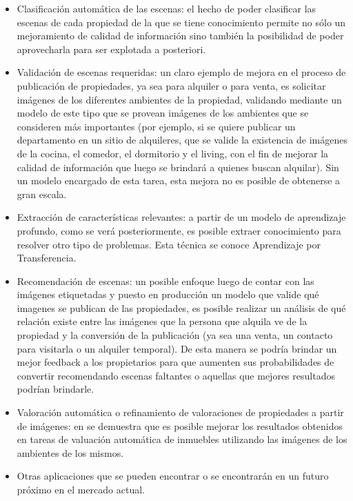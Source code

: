 \begin{itemize}
	\item Clasificación automática de las escenas: el hecho de poder clasificar las escenas de cada propiedad de la que se tiene conocimiento permite no sólo un mejoramiento de calidad de información sino también la posibilidad de poder aprovecharla para ser explotada a posteriori.
	\item Validación de escenas requeridas: un claro ejemplo de mejora en el proceso de publicación de propiedades, ya sea para alquiler o para venta, es solicitar imágenes de los diferentes ambientes de la propiedad, validando mediante un modelo de este tipo que se provean imágenes de los ambientes que se consideren más importantes (por ejemplo, si se quiere publicar un departamento en un sitio de alquileres, que se valide la existencia de imágenes de la cocina, el comedor, el dormitorio y el living, con el fin de mejorar la calidad de información que luego se brindará a quienes buscan alquilar). Sin un modelo encargado de esta tarea, esta mejora no es posible de obtenerse a gran escala.
	\item Extracción de características relevantes: a partir de un modelo de aprendizaje profundo, como se verá posteriormente, es posible extraer conocimiento para resolver otro tipo de problemas. Esta técnica se conoce Aprendizaje por Transferencia. 
	\item Recomendación de escenas: un posible enfoque luego de contar con las imágenes etiquetadas y puesto en producción un modelo que valide qué imagenes se publican de las propiedades, es posible realizar un análisis de qué relación existe entre las imágenes que la persona que alquila ve de la propiedad y la conversión de la publicación (ya sea una venta, un contacto para visitarla o un alquiler temporal). De esta manera se podría brindar un mejor feedback a los propietarios para que aumenten sus probabilidades de convertir recomendando escenas faltantes o aquellas que mejores resultados podrían brindarle.
	\item Valoración automática o refinamiento de valoraciones de propiedades a partir de imágenes: en \cite{vision_based_real_estate_price_estimation} se demuestra que es posible mejorar los resultados obtenidos en tareas de valuación automática de inmuebles utilizando las imágenes de los ambientes de los mismos. 
	\item Otras aplicaciones que se pueden encontrar o se encontrarán en un futuro próximo en el mercado actual.
\end{itemize}

